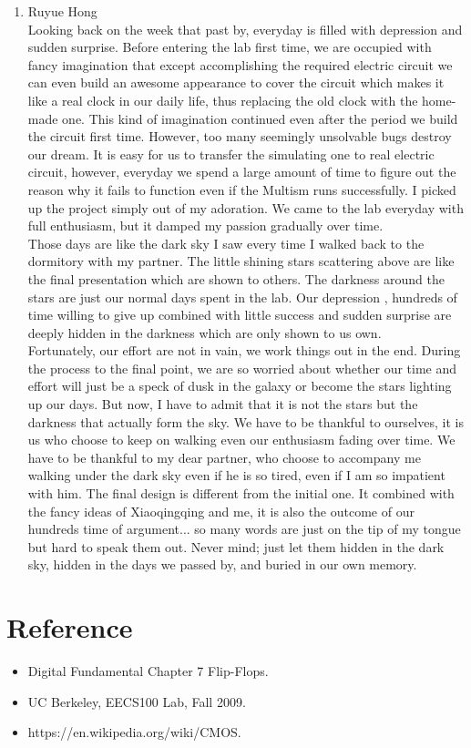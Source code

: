 \documentclass[12pt]{article}
\begin{document}
\begin{enumerate}
\item Ruyue Hong\\
Looking back on the week that past by, everyday is filled with depression and sudden surprise. Before entering the lab first time, we are occupied with fancy imagination that except accomplishing the required electric circuit we can even build an awesome appearance to cover the circuit which makes it like a real clock in our daily life, thus replacing the old clock with the home-made one. This kind of imagination continued even after the period we build the circuit first time. However, too many seemingly unsolvable bugs destroy our dream. It is easy for us to transfer the simulating one to real electric circuit, however, everyday we spend a large amount of time to figure out the reason why it fails to function even if the Multism runs successfully. I picked up the project simply out of my adoration. We came to the lab everyday with full enthusiasm, but it damped my passion gradually over time. \\
Those days are like the dark sky I saw every time I walked back to the dormitory with my partner. The little shining stars scattering above are like the final presentation which are shown to others. The darkness around the stars are just our normal days spent in the lab. Our depression , hundreds of time willing to give up combined with little success and sudden surprise are deeply hidden in the darkness which are only shown to us own. \\
Fortunately, our effort are not in vain, we work things out in the end. During the process to the final point, we are so worried about whether our time and effort will just be a speck of dusk in the galaxy or become the stars lighting up our days. But now, I have to admit that it is not the stars but the darkness that actually form the sky. We have to be thankful to ourselves, it is us who choose to keep on walking even our enthusiasm fading over time. We have to be thankful to my dear partner, who choose to accompany me walking under the dark sky even if he is so tired, even if I am so impatient with him. The final design is different from the initial one. It combined with the fancy ideas of Xiaoqingqing and me, it is also the outcome of our hundreds time of argument... so many words are just on the tip of my tongue but hard to speak them out. Never mind; just let them hidden in the dark sky, hidden in the days we passed by, and buried in our own memory.\\


\end{enumerate}

\section{Reference}
\begin{itemize}
\item Digital Fundamental Chapter 7 Flip-Flops.
\item UC Berkeley, EECS100 Lab, Fall 2009.
\item https://en.wikipedia.org/wiki/CMOS.
\end{itemize}
\end{document}
